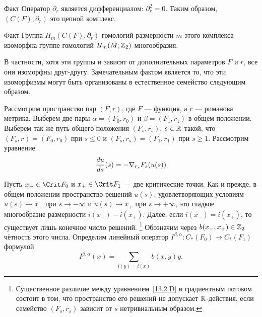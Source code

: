 \begin{thm}{Факт}\label{13.2.B}
  Оператор $\partial_{r}$ является дифференциалом: $\partial_{r}^{2}=0$.
  Таким образом, $(C(F),\partial_{r})$ это цепной комплекс. 
\end{thm}

\begin{thm}{Факт}\label{13.2.C}
  Группа $H_{m}(C(F),\partial_{r})$ гомологий размерности $m$ этого
  комплекса изоморфна группе гомологий $H_{m}(M; \mathbb{Z}_{2})$ многообразия.
\end{thm}

В частности, хотя эти группы и зависят от дополнительных параметров
$F$ и $r$, все они изоморфны друг-другу.
Замечательным фактом является то, что эти изоморфизмы могут быть
организованы в естественное семейство
следующим образом. 

Рассмотрим пространство пар $(F, r)$, где $F$ — функция, а $r$ —
риманова метрика. 
Выберем две пары $\alpha = (F_{0}, r_{0})$ и
$\beta = (F_{1},r_{1})$ в общем положении. Выберем так же путь общего положения
$(F_{s},r_{s})$, $s\in\mathbb{R}$ такой, что
$(F_{s}, r_{}) = (F_{0}, r_{0})$ при $s\le0$ и
$(F_{s}, r_{s}) = (F_{1},r_{1})$ при $s\ge1$.
Рассмотрим уравнение
\begin{equation}\label{13.2.D}
  \frac{d u}{d s}(s)=-\nabla_{r_{s}}F_{s}(u(s))
\end{equation}

Пусть $x_{-}\in\Crit F_{0}$ и $x_{+}\in\Crit F_{1}$ — две критические точки.
Как и прежде, в общем положении пространство решений $u(s)$,
удовлетворяющих условиям $u(s)\to x_{-}$ при $s\to-\infty$ и $u(s)\to
x_{+}$ при  $s\to+\infty$, это гладкое многообразие размерности
$i(x_{-})-i(x_{+})$.
Далее, если $i(x_{-}) = i(x_{+})$, то существует лишь конечное число
решений.%
\footnote{Существенное различие между уравнением~\ref{13.2.D} и
  градиентным потоком состоит в том, что пространство его решений
  не допускает $\mathbb{R}$-действия, если семейство $(F_{s},r_{s})$ зависит
  от $s$ нетривиальным образом.}
Обозначим через $b(x_{-},x_{+})\in\mathbb{Z}_{2}$ чётность этого числа.
Определим линейный оператор
$I^{\beta,\alpha} : C_{*}(F_{0})\to C_{*}(F_{1})$ формулой
\[
I^{\beta,\alpha}(x) = \sum_{i(y)=i(x)}b(x, y)y.
\]

